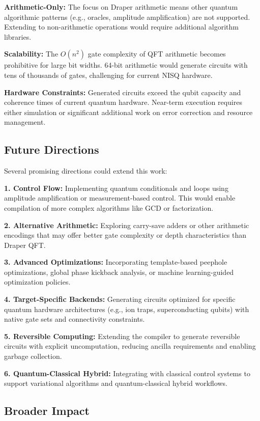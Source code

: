 \documentclass[a4paper,twocolumn]{article}
\begin{document}
\textbf{Arithmetic-Only:} The focus on Draper arithmetic means other quantum algorithmic
patterns (e.g., oracles, amplitude amplification) are not supported. Extending to non-arithmetic
operations would require additional algorithm libraries.

\textbf{Scalability:} The $O(n^2)$ gate complexity of QFT arithmetic becomes prohibitive for large
bit widths. 64-bit arithmetic would generate circuits with tens of thousands of gates, challenging
for current NISQ hardware.

\textbf{Hardware Constraints:} Generated circuits exceed the qubit capacity and coherence times of current
quantum hardware. Near-term execution requires either simulation or significant additional work on
error correction and resource management.

\subsection{Future Directions}

Several promising directions could extend this work:

\textbf{1. Control Flow:} Implementing quantum conditionals and loops using amplitude amplification
or measurement-based control. This would enable compilation of more complex algorithms like GCD or factorization.

\textbf{2. Alternative Arithmetic:} Exploring carry-save adders or other arithmetic encodings that
may offer better gate complexity or depth characteristics than Draper QFT.

\textbf{3. Advanced Optimizations:} Incorporating template-based peephole optimizations, global
phase kickback analysis, or machine learning-guided optimization policies.

\textbf{4. Target-Specific Backends:} Generating circuits optimized for specific quantum hardware
architectures (e.g., ion traps, superconducting qubits) with native gate sets and connectivity constraints.

\textbf{5. Reversible Computing:} Extending the compiler to generate reversible circuits with
explicit uncomputation, reducing ancilla requirements and enabling garbage collection.

\textbf{6. Quantum-Classical Hybrid:} Integrating with classical control systems to support
variational algorithms and quantum-classical hybrid workflows.

\subsection{Broader Impact}
\end{document}
